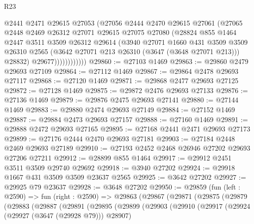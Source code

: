 \begin{lexlean}{R23}
\begin{coremodule}
                      @2441
                      @2471
                      @29615
                      @27053
                      (@27056
                        @2444
                        @2470
                        @29615
                        @27061
                        (@27065
                          @2448
                          @2469
                          @26312
                          @27071
                          @29615
                          @27075
                          @27080
                          (@28824
                            @855
                            @1464
                            @2447
                            @3511
                            @3509
                            @26312
                            @29614
                            (@3940
                              @27071
                              @1660
                              @431
                              @3509
                              @3509
                              @26310
                              @2565
                              (@3642 @27071 @213 @26310 (@3647 (@3648 @27071 @213)))
                              @28832)
                            @29677))))))))))))
@29860 := @27103 @1469
@29863 := @29860 @2479 @29693 @27109
@29864 := @27112 @1469
@29867 := @29864 @2478 @29693 @27117
@29868 := @27120 @1469
@29871 := @29868 @2477 @29693 @27125
@29872 := @27128 @1469
@29875 := @29872 @2476 @29693 @27133
@29876 := @27136 @1469
@29879 := @29876 @2475 @29693 @27141
@29880 := @27144 @1469
@29883 := @29880 @2474 @29693 @27149
@29884 := @27152 @1469
@29887 := @29884 @2473 @29693 @27157
@29888 := @27160 @1469
@29891 := @29888 @2472 @29693 @27165
@29895 := @27168 @2441 @2471 @29693 @27173
@29899 := @27176 @2444 @2470 @29693 @27181
@29903 := @27184 @2448 @2469 @29693 @27189
@29910 := @27193 @2452 @2468 @26946 @27202 @29693 @27206 @27211
@29912 := @28899 @855 @1464
@29917 := @29912 @2451 @3511 @3509 @29740 @29692
@29918 := @3940 @27202
@29924 := @29918 @1667 @431 @3509 @3509 @23637 @2565
@29925 := @3642 @27202
@29927 := @29925 @79 @23637
@29928 := @3648 @27202
@29950 := @29859
    (fun (left : @2590) =>
    fun (right : @2590) =>
    @29863
      (@29867
        (@29871
          (@29875
            (@29879
              (@29883
                (@29887
                  (@29891
                    (@29895
                      (@29899
                        (@29903
                          (@29910
                            (@29917
                              (@29924 (@29927 (@3647 (@29928 @79))) @28907)

\end{coremodule}
\end{lexlean}

